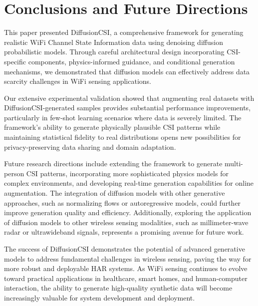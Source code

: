 \documentclass[journal]{IEEEtran}
\begin{document}
\section{Conclusions and Future Directions}

This paper presented DiffusionCSI, a comprehensive framework for generating realistic WiFi Channel State Information data using denoising diffusion probabilistic models. Through careful architectural design incorporating CSI-specific components, physics-informed guidance, and conditional generation mechanisms, we demonstrated that diffusion models can effectively address data scarcity challenges in WiFi sensing applications.

Our extensive experimental validation showed that augmenting real datasets with DiffusionCSI-generated samples provides substantial performance improvements, particularly in few-shot learning scenarios where data is severely limited. The framework's ability to generate physically plausible CSI patterns while maintaining statistical fidelity to real distributions opens new possibilities for privacy-preserving data sharing and domain adaptation.

Future research directions include extending the framework to generate multi-person CSI patterns, incorporating more sophisticated physics models for complex environments, and developing real-time generation capabilities for online augmentation. The integration of diffusion models with other generative approaches, such as normalizing flows or autoregressive models, could further improve generation quality and efficiency. Additionally, exploring the application of diffusion models to other wireless sensing modalities, such as millimeter-wave radar or ultrawideband signals, represents a promising avenue for future work.

The success of DiffusionCSI demonstrates the potential of advanced generative models to address fundamental challenges in wireless sensing, paving the way for more robust and deployable HAR systems. As WiFi sensing continues to evolve toward practical applications in healthcare, smart homes, and human-computer interaction, the ability to generate high-quality synthetic data will become increasingly valuable for system development and deployment.
\end{document}
